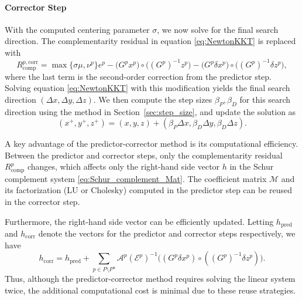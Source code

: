 \paragraph{Corrector Step}
With the computed centering parameter $\sigma$, we now solve for the final search direction.
The complementarity residual in equation \eqref{eq:NewtonKKT} is replaced with
\[R^{p,\text{corr}}_{\text{comp}}=\max\{\sigma \mu, \nu^p\} e^p - \big(G^p x^p\big) \circ\big ((G^p)^{-1} z^p\big) - \big(G^p \delta x^p\big)\circ\big((G^p)^{-1} \delta z^p\big),\]
where the last term is the second-order correction from the predictor step.
Solving equation \eqref{eq:NewtonKKT} with this modification yields the final search direction $(\Delta x, \Delta y, \Delta z)$.
We then compute the step sizes $\beta_P, \beta_D$ for this search direction using the method in Section~\ref{sec:step_size}, and update the solution as
\[(x^+, y^+, z^+) = (x, y, z) + (\beta_P \Delta x, \beta_D \Delta y, \beta_D \Delta z).\]

\medskip
\medskip
A key advantage of the predictor-corrector method is its computational efficiency.
Between the predictor and corrector steps, only the complementarity residual $R^p_{\text{comp}}$ changes, which affects only the right-hand side vector $h$ in the Schur complement system \eqref{eq:Schur_complement_Mat}.
The coefficient matrix $\mathcal{M}$ and its factorization (LU or Cholesky) computed in the predictor step can be reused in the corrector step.

Furthermore, the right-hand side vector can be efficiently updated.
Letting $h_{\text{pred}}$ and $h_{\text{corr}}$ denote the vectors for the predictor and corrector steps respectively, we have
\[h_{\text{corr}}=h_{\text{pred}} + \sum_{p\in P\setminus P^u} \mathcal{A}^p (\mathcal{E}^p)^{-1} \big((G^p \delta x^p) \circ ((G^p)^{-1} \delta z^p) \big).\]
Thus, although the predictor-corrector method requires solving the linear system twice, the additional computational cost is minimal due to these reuse strategies.
